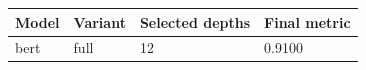 \begin{tabular}{llll}
\hline
Model & Variant & Selected depths & Final metric \\
\hline
bert & full & 12 & 0.9100 \\
\hline
\end{tabular}
